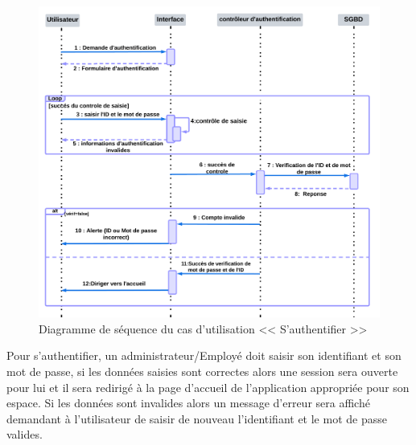 \documentclass[12pt]{report}
\begin{document}
\begin{figure}[H]
  \centering
  \includegraphics[width=18.5cm]{4}
  \caption{ Diagramme de séquence du cas d'utilisation << S'authentifier >>}
  \label{fig:votre-label}
\end{figure}
Pour s'authentifier, un administrateur/Employé doit saisir son identifiant et son mot de passe, si les données saisies sont correctes alors une session sera ouverte pour lui et il sera redirigé à la page d'accueil de l'application appropriée pour son espace. Si les données sont invalides alors un message d'erreur sera affiché demandant à l'utilisateur de saisir de nouveau l'identifiant et le mot de passe valides.
\end{document}
